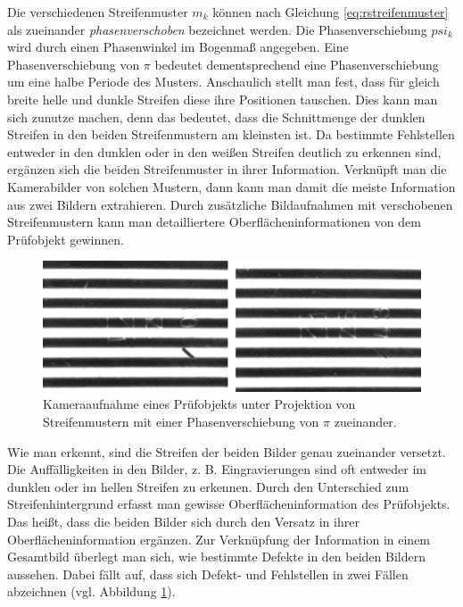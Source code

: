 \noindent
Die verschiedenen Streifenmuster $m_k$ können nach Gleichung \ref{eq:rstreifenmuster} als zueinander \textit{phasenverschoben} bezeichnet werden.
Die Phasenverschiebung $psi_k$ wird durch einen Phasenwinkel im Bogenmaß angegeben.
Eine Phasenverschiebung von $ \pi $ bedeutet dementsprechend eine Phasenverschiebung um eine halbe Periode des Musters.
Anschaulich stellt man fest, dass für gleich breite helle und dunkle Streifen diese ihre Positionen tauschen.
Dies kann man sich zunutze machen, denn das bedeutet, dass die Schnittmenge der dunklen Streifen in den beiden Streifenmustern am kleinsten ist.
Da bestimmte Fehlstellen entweder in den dunklen oder in den weißen Streifen deutlich zu erkennen sind, ergänzen sich die beiden Streifenmuster in ihrer Information.
Verknüpft man die Kamerabilder von solchen Mustern, dann kann man damit die meiste Information aus zwei Bildern extrahieren.
Durch zusätzliche Bildaufnahmen mit verschobenen Streifenmustern kann man detailliertere Oberflächeninformationen von dem Prüfobjekt gewinnen.

\begin{figure}[H]
	\centering
	\includegraphics[width=\textwidth]{03_sichtpruefungDurchLichtstreuung/einsatzVonMehrerenStreifenmustern/figures/imageToLink}
	\caption[Zu verknüpfende Bilder]{Kameraaufnahme eines Prüfobjekts unter Projektion von Streifenmustern mit einer Phasenverschiebung von $ \pi $ zueinander.}
	\label{img:imageToLink}
\end{figure}

\noindent
Wie man erkennt, sind die Streifen der beiden Bilder genau zueinander versetzt.
Die Auffälligkeiten in den Bilder, z. B. Eingravierungen sind oft entweder im dunklen oder im hellen Streifen zu erkennen.
Durch den Unterschied zum Streifenhintergrund erfasst man gewisse Oberflächeninformation des Prüfobjekts.
Das heißt, dass die beiden Bilder sich durch den Versatz in ihrer Oberflächeninformation ergänzen.
Zur Verknüpfung der Information in einem Gesamtbild überlegt man sich, wie bestimmte Defekte in den beiden Bildern aussehen.
Dabei fällt auf, dass sich Defekt- und Fehlstellen in zwei Fällen abzeichnen (vgl. Abbildung \ref{img:imageToLink}).

